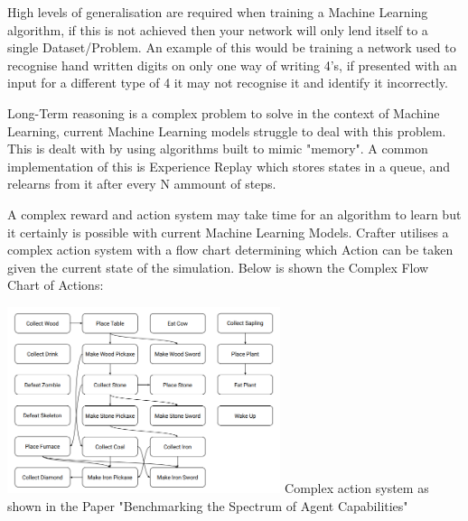 \begin{flushleft}
\begin{enumerate}
\begin{enumerate}
\begin{enumerate}
                            High levels of generalisation are required when training a Machine Learning algorithm, if this is not achieved then
                            your network will only lend itself to a single Dataset/Problem. An example of this would be training a network used
                            to recognise hand written digits on only one way of writing 4's, if presented with an input for a different type of 
                            4 it may not recognise it and identify it incorrectly. \\
                            
                            \vspace{0.2cm}

                            Long-Term reasoning is a complex problem to solve in the context of Machine Learning, current Machine Learning models
                            struggle to deal with this problem. This is dealt with by using algorithms built to mimic "memory". A common 
                            implementation of this is Experience Replay which stores states in a queue, and relearns from it after every N ammount
                            of steps. \\

                            \vspace{0.2cm}

                            A complex reward and action system may take time for an algorithm to learn but it certainly is possible with current
                            Machine Learning Models. Crafter utilises a complex action system with a flow chart determining which Action can be taken
                            given the current state of the simulation. Below is shown the Complex Flow Chart of Actions: \\

                            \vspace{0.2cm}
                            \begin{center}
                                \includegraphics[width=8cm]{Images/Initial Research/CrafterComplexActionSystem.PNG}
                                Complex action system as shown in the Paper "Benchmarking the Spectrum of Agent Capabilities" \\
                            \end{center}
                            \vspace{0.2cm}


\end{enumerate}
\end{enumerate}
\end{enumerate}
\end{flushleft}
